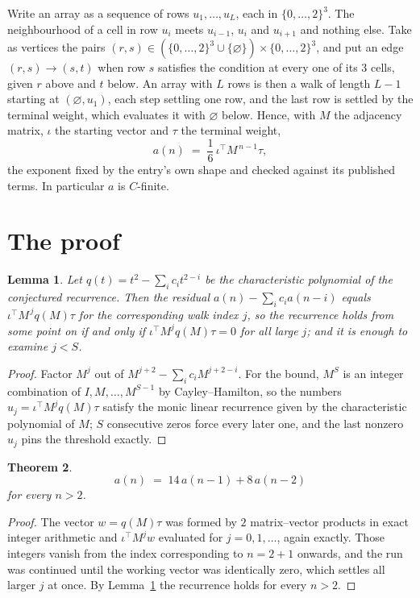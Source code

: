 \documentclass[11pt,a4paper]{article}
\theoremstyle{plain}
\newtheorem{theorem}{Theorem}
\newtheorem{lemma}[theorem]{Lemma}
\theoremstyle{definition}
\begin{document}
Write an array as a sequence of rows $u_1,\dots,u_L$, each in
$\{0,\dots,2\}^{3}$. The neighbourhood of a cell in row $u_i$ meets $u_{i-1}$,
$u_i$ and $u_{i+1}$ and nothing else. Take as vertices the pairs
$(r,s)\in(\{0,\dots,2\}^{3}\cup\{\varnothing\})\times\{0,\dots,2\}^{3}$,
and put an edge $(r,s)\to(s,t)$ when row $s$ satisfies the condition at every one of its
$3$ cells, given $r$ above and $t$ below. An array with $L$ rows is then a walk of length
$L-1$ starting at $(\varnothing,u_1)$, each step settling one row, and the last row is
settled by the terminal weight, which evaluates it with $\varnothing$ below. Hence,
with $M$ the adjacency matrix, $\iota$ the starting vector and $\tau$ the terminal weight,
\[
a(n)\;=\;\frac{1}{6}\,\iota^{\!\top}M^{\,n-1}\tau ,
\]
the exponent fixed by the entry's own shape and checked against its published terms. In
particular $a$ is $C$-finite.

\section{The proof}

\begin{lemma}\label{lem:crit}
Let $q(t)=t^{2}-\sum_i c_it^{2-i}$ be the characteristic polynomial of the
conjectured recurrence. Then the residual $a(n)-\sum_ic_ia(n-i)$ equals
$\iota^{\!\top}M^{\,j}q(M)\tau$ for the corresponding walk index $j$, so the
recurrence holds from some point on if and only if $\iota^{\!\top}M^{j}q(M)\tau=0$ for all
large $j$; and it is enough to examine $j<S$.
\end{lemma}

\begin{proof}
Factor $M^{j}$ out of $M^{j+2}-\sum_ic_iM^{j+2-i}$. For the bound, $M^{S}$
is an integer combination of $I,M,\dots,M^{S-1}$ by Cayley--Hamilton, so the numbers
$u_j=\iota^{\!\top}M^{j}q(M)\tau$ satisfy the monic linear recurrence given by the
characteristic polynomial of $M$; $S$ consecutive zeros force every later one, and the last
nonzero $u_j$ pins the threshold exactly.
\end{proof}

\begin{theorem}
\[
a(n)\;=\;14\,a(n-1) + 8\,a(n-2)
\]
for every $n>2$.
\end{theorem}

\begin{proof}
The vector $w=q(M)\tau$ was formed by $2$ matrix--vector products in exact integer
arithmetic and $\iota^{\!\top}M^{j}w$ evaluated for $j=0,1,\dots$, again exactly. Those
integers vanish from the index corresponding to $n=2+1$ onwards, and the run was
continued until the working vector was identically zero, which settles all larger $j$ at once.
By Lemma~\ref{lem:crit} the recurrence holds for every $n>2$.
\end{proof}
\end{document}
